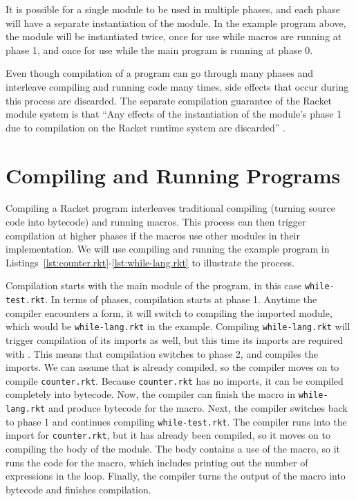 It is possible for a single module to be used in multiple phases, and each phase will have a separate instantiation of the module.
In the example program above, the  module will be instantiated twice, once for use while macros are running at phase 1, and once for use while the main program is running at phase 0.

Even though compilation of a program can go through many phases and interleave compiling and running code many times, side effects that occur during this process are discarded. 
The separate compilation guarantee of the Racket module system is that ``Any effects of the instantiation of the module's phase 1 due to compilation on the Racket runtime system are discarded'' \cite{sep}. 


\section{Compiling and Running Programs}

Compiling a Racket program interleaves traditional compiling (turning source code into bytecode) and running macros.
This process can then trigger compilation at higher phases if the macros use other modules in their implementation.
We will use compiling and running the example program in Listings~\ref{lst:counter.rkt}-\ref{lst:while-lang.rkt} to illustrate the process.

Compilation starts with the main module of the program, in this case \texttt{while-test.rkt}.
In terms of phases, compilation starts at phase 1.
Anytime the compiler encounters a  form, it will switch to compiling the imported module, which would be \texttt{while-lang.rkt} in the example.
Compiling \texttt{while-lang.rkt} will trigger compilation of its imports as well, but this time its imports are required with .
This means that compilation switches to phase 2, and compiles the imports.
We can assume that  is already compiled, so the compiler moves on to compile \texttt{counter.rkt}. 
Because \texttt{counter.rkt} has no imports, it can be compiled completely into bytecode.
Now, the compiler can finish the macro in \texttt{while-lang.rkt} and produce bytecode for the macro. 
Next, the compiler switches back to phase 1 and continues compiling \texttt{while-test.rkt}.
The compiler runs into the import for \texttt{counter.rkt}, but it has already been compiled, so it moves on to compiling the body of the module.
The body contains a use of the  macro, so it runs the code for the macro, which includes printing out the number of expressions in the  loop. 
Finally, the compiler turns the output of the macro into bytecode and finishes compilation.

